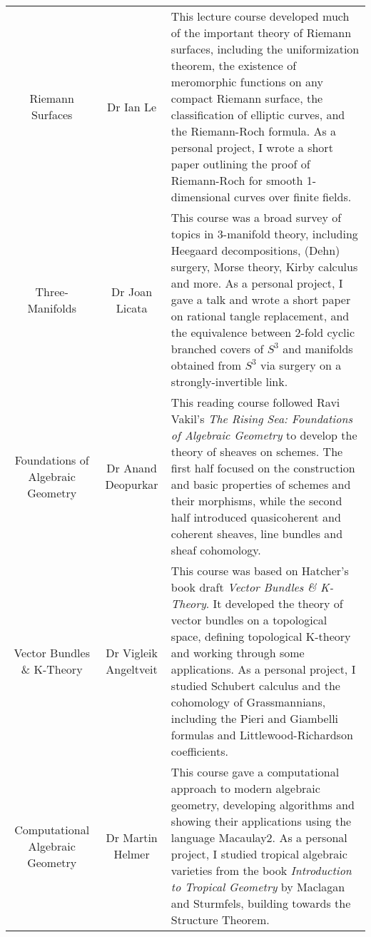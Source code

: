 \documentclass[a4paper,10pt]{article} %
\begin{document}
\begin{tabulary}{\textwidth}{ C  C  L }
Riemann Surfaces & Dr Ian Le & \footnotesize This lecture course developed much of the important theory of Riemann surfaces, including the uniformization theorem, the existence of meromorphic functions on any compact Riemann surface, the classification of elliptic curves, and the Riemann-Roch formula. As a personal project, I wrote a short paper outlining the proof of Riemann-Roch for smooth 1-dimensional curves over finite fields. \normalsize\\

Three-Manifolds & Dr Joan Licata & \footnotesize This course was a broad survey of topics in 3-manifold theory, including Heegaard decompositions, (Dehn) surgery, Morse theory, Kirby calculus and more. As a personal project, I gave a talk and wrote a short paper on rational tangle replacement, and the equivalence between 2-fold cyclic branched covers of $S^3$ and manifolds obtained from $S^3$ via surgery on a strongly-invertible link. \normalsize\\

Foundations of Algebraic Geometry & Dr Anand Deopurkar & \footnotesize This reading course followed Ravi Vakil’s \emph{The Rising Sea: Foundations of Algebraic Geometry} to develop the theory of sheaves on schemes. The first half focused on the construction and basic properties of schemes and their morphisms, while the second half introduced quasicoherent and coherent sheaves, line bundles and sheaf cohomology. \normalsize\\

Vector Bundles \& K-Theory & Dr Vigleik Angeltveit & \footnotesize This course was based on Hatcher's book draft \emph{Vector Bundles \& K-Theory}. It developed the theory of vector bundles on a topological space, defining topological K-theory and working through some applications. As a personal project, I studied Schubert calculus and the cohomology of Grassmannians, including the Pieri and Giambelli formulas and Littlewood-Richardson coefficients. \normalsize\\

Computational Algebraic Geometry & Dr Martin Helmer & \footnotesize This course gave a computational approach to modern algebraic geometry, developing algorithms and showing their applications using the language Macaulay2. As a personal project, I studied tropical algebraic varieties from the book \emph{Introduction to Tropical Geometry} by Maclagan and Sturmfels, building towards the Structure Theorem.\normalsize\\


\end{tabulary}
\end{document}
